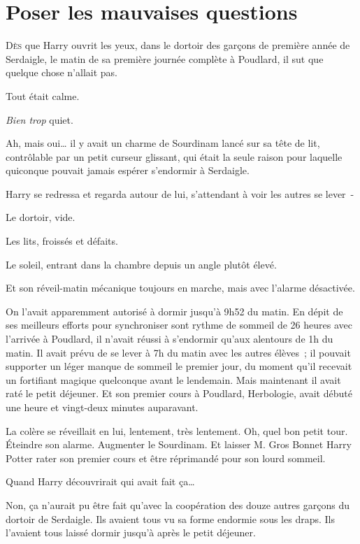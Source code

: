 \chapter{Poser les mauvaises questions}

\lettrine{D}{ès} que Harry ouvrit les yeux, dans le dortoir des garçons de première année de Serdaigle, le matin de sa première journée complète à Poudlard, il sut que quelque chose n'allait pas.

Tout était calme.

\emph{Bien trop} quiet.

Ah, mais oui… il y avait un charme de Sourdinam lancé sur sa tête de lit, contrôlable par un petit curseur glissant, qui était la seule raison pour laquelle quiconque pouvait jamais espérer s'endormir à Serdaigle.

Harry se redressa et regarda autour de lui, s'attendant à voir les autres se lever~-

Le dortoir, vide.

Les lits, froissés et défaits.

Le soleil, entrant dans la chambre depuis un angle plutôt élevé.

Et son réveil-matin mécanique toujours en marche, mais avec l'alarme désactivée.

On l'avait apparemment autorisé à dormir jusqu'à 9h52 du matin. En dépit de ses meilleurs efforts pour synchroniser sont rythme de sommeil de 26 heures avec l'arrivée à Poudlard, il n'avait réussi à s'endormir qu'aux alentours de 1h du matin. Il avait prévu de se lever à 7h du matin avec les autres élèves~; il pouvait supporter un léger manque de sommeil le premier jour, du moment qu'il recevait un fortifiant magique quelconque avant le lendemain. Mais maintenant il avait raté le petit déjeuner. Et son premier cours à Poudlard, Herbologie, avait débuté une heure et vingt-deux minutes auparavant.

La colère se réveillait en lui, lentement, très lentement. Oh, quel bon petit tour. Éteindre son alarme. Augmenter le Sourdinam. Et laisser M. Gros Bonnet Harry Potter rater son premier cours et être réprimandé pour son lourd sommeil.

Quand Harry découvrirait qui avait fait ça…

Non, ça n'aurait pu être fait qu'avec la coopération des douze autres garçons du dortoir de Serdaigle. Ils avaient tous vu sa forme endormie sous les draps. Ils l'avaient tous laissé dormir jusqu'à après le petit déjeuner.

